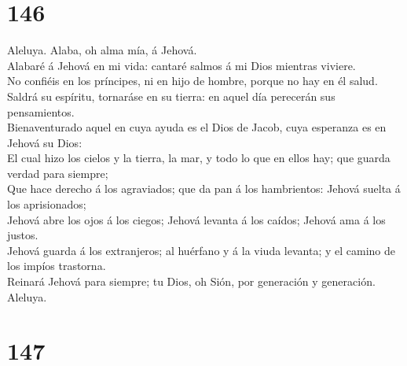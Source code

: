 \hypertarget{section-145}{%
\section{146}\label{section-145}}

 Aleluya. Alaba, oh alma mía, á Jehová.\\
 Alabaré á Jehová en mi vida: cantaré salmos á mi Dios
mientras viviere.\\
 No confiéis en los príncipes, ni en hijo de hombre, porque
no hay en él salud.\\
 Saldrá su espíritu, tornaráse en su tierra: en aquel día
perecerán sus pensamientos.\\
 Bienaventurado aquel en cuya ayuda es el Dios de Jacob,
cuya esperanza es en Jehová su Dios:\\
 El cual hizo los cielos y la tierra, la mar, y todo lo que
en ellos hay; que guarda verdad para siempre;\\
 Que hace derecho á los agraviados; que da pan á los
hambrientos: Jehová suelta á los aprisionados;\\
 Jehová abre los ojos á los ciegos; Jehová levanta á los
caídos; Jehová ama á los justos.\\
 Jehová guarda á los extranjeros; al huérfano y á la viuda
levanta; y el camino de los impíos trastorna.\\
 Reinará Jehová para siempre; tu Dios, oh Sión, por
generación y generación. Aleluya.

\hypertarget{section-146}{%
\section{147}\label{section-146}}


